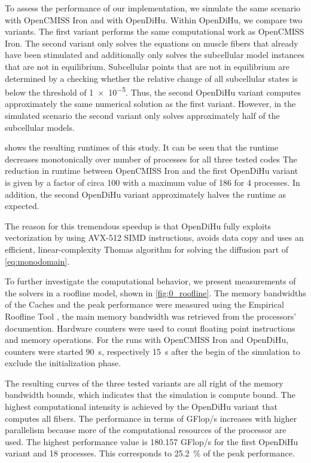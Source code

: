 To assess the performance of our implementation, we simulate the same scenario with OpenCMISS Iron and with OpenDiHu. 
Within OpenDiHu, we compare two variants. 
The first variant performs the same computational work as OpenCMISS Iron. 
The second variant only solves the equations on muscle fibers that already have been stimulated and additionally only solves the subcellular model instances that are not in equilibrium. 
Subcellular points that are not in equilibrium are determined by a checking whether the relative change of all subcellular states is below the threshold of \num{1e-5}. 
Thus, the second OpenDiHu variant computes approximately the same numerical solution as the first variant.
However, in the simulated scenario the second variant only solves approximately half of the subcellular models.

 shows the resulting runtimes of this study. It can be seen that the runtime decreases monotonically  over number of processes for all three tested codes 
The reduction in runtime between OpenCMISS Iron and the first OpenDiHu variant is given by a factor of circa 100 with a maximum value of 186 for 4 processes. In addition, the second OpenDiHu variant approximately halves the runtime as expected.

The reason for this tremendous speedup is that OpenDiHu fully exploits vectorization by using AVX-512 SIMD instructions, avoids data copy and uses an efficient, linear-complexity Thomas algorithm for solving the diffusion part of \cref{eq:monodomain}.

To further investigate the computational behavior, we present measurements of the solvers in a roofline model, shown in \cref{fig:0_roofline}. The memory bandwidths of the Caches and the peak performance were measured using the Empirical Roofline Tool \cite{ert}, the main memory bandwidth was retrieved from the processors' documention.
Hardware counters were used to count floating point instructions and memory operations. 
For the runs with OpenCMISS Iron and OpenDiHu, counters were started \SI{90}{\second}, respectively \SI{15}{\second} after the begin of the simulation to exclude the initialization phase.

The resulting curves of the three tested variants are all right of the memory bandwidth bounds, which indicates that the simulation is compute bound. The highest computational intensity is achieved by the OpenDiHu variant that computes all fibers. The performance in terms of GFlop/s increases with higher parallelism because more of the computational resources of the processor are used. 
The highest performance value is \SI{180.157}{} GFlop/s for the first OpenDiHu variant and 18 processes. This corresponds to \SI{25.2}{\percent} of the peak performance.

